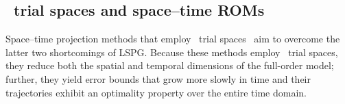 \documentclass[3p,computermodern,10pt]{elsarticle}
\begin{document}

\subsection{\spaceTimeAcronym\ trial spaces and space--time ROMs}
Space--time projection methods that employ \spaceTimeAcronym\ trial
spaces~\cite{choi_stlspg,constantine_strom,URBAN2012203,Yano2014ASC,benner_st,bui_thesis}
aim to overcome the latter two shortcomings of LSPG. Because these methods employ \spaceTimeAcronym\ trial
spaces, they reduce both the spatial and temporal dimensions of the full-order
model; further, they yield error bounds that grow more slowly in time and
their trajectories exhibit an optimality property over the entire time domain. 
\end{document}
